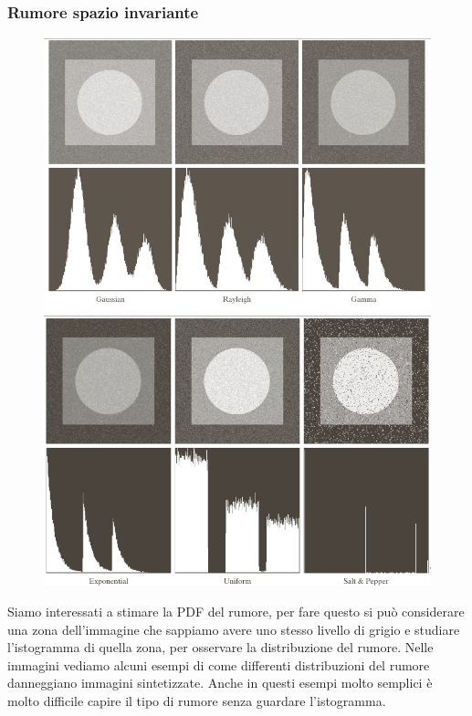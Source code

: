 \subsubsection{Rumore spazio invariante} 
\begin{figure}
	\vspace{-.8cm}
	\centering
	\includegraphics[width=.95\linewidth]{Picture/Noise_Distribution1}
	\\
	\vspace{.1cm}
	\includegraphics[width=.95\linewidth]{Picture/Noise_Distribution2}
\end{figure}
Siamo interessati a stimare la PDF del rumore, per fare questo si può considerare una zona dell'immagine che sappiamo avere uno stesso livello di grigio e studiare l'istogramma di quella zona, per osservare la distribuzione del rumore. Nelle immagini vediamo alcuni esempi di come differenti distribuzioni del rumore danneggiano immagini sintetizzate. Anche in questi esempi molto semplici è molto difficile capire il tipo di rumore senza guardare l'istogramma.


